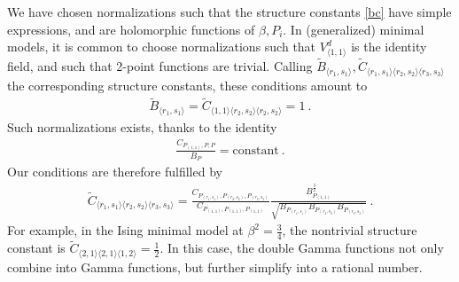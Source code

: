 \documentclass[12pt, a4paper]{article}
\theoremstyle{break}
\begin{document}
We have chosen normalizations such that the structure constants \eqref{bc} have simple expressions, and are holomorphic functions of $\beta,P_i$. In (generalized) minimal models, it is common to choose normalizations such that $V^d_{\langle 1,1\rangle}$ is the identity field, and such that 2-point functions are trivial. Calling $\tilde{B}_{\langle r_1,s_1\rangle},\tilde{C}_{\langle r_1,s_1\rangle\langle r_2,s_2\rangle \langle r_3,s_3\rangle}$ the corresponding structure constants, these conditions amount to 
\begin{align}
 \tilde{B}_{\langle r_1,s_1\rangle} = \tilde{C}_{\langle 1,1\rangle\langle r_2,s_2\rangle \langle r_2,s_2\rangle} = 1\ .
\end{align}
Such normalizations exists, thanks to the identity 
\begin{align}
 \frac{C_{P_{(1,1)}, P, P}}{B_P} = \text{constant}\ . 
\end{align}
Our conditions are therefore fulfilled by 
\begin{align}
 \tilde{C}_{\langle r_1,s_1\rangle\langle r_2,s_2\rangle \langle r_3,s_3\rangle} 
 = \frac{C_{P_{(r_1,s_1)},P_{(r_2,s_2)},P_{(r_3,s_3)}}}{C_{P_{(1,1)},P_{(1,1)},P_{(1,1)}}}
 \frac{B_{P_{(1,1)}}^\frac32}
 {\sqrt{B_{P_{(r_1,s_1)}}B_{P_{(r_2,s_2)}} B_{P_{(r_3,s_3)}}}}\ .
\end{align}
For example, in the Ising minimal model at $\beta^2=\frac34$, the nontrivial structure constant is $\tilde{C}_{\langle 2,1\rangle\langle 2,1\rangle\langle 1,2\rangle}=\frac12$. In this case, the double Gamma functions not only combine into Gamma functions, but further simplify into a rational number. 
\end{document}
